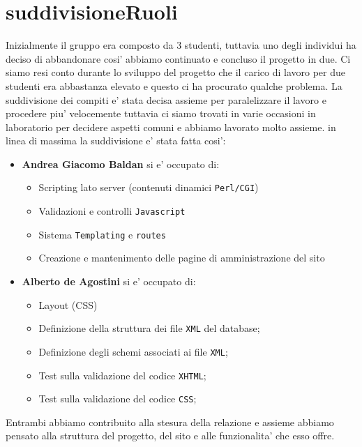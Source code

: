 \section{suddivisioneRuoli}

Inizialmente il gruppo era composto da 3 studenti, tuttavia uno degli individui ha deciso di abbandonare cosi' abbiamo continuato e concluso il progetto in due.
Ci siamo resi conto durante lo sviluppo del progetto che il carico di lavoro per due studenti era abbastanza elevato e questo ci ha procurato qualche problema.
La suddivisione dei compiti e' stata decisa assieme per paralelizzare il lavoro e procedere piu' velocemente tuttavia ci siamo trovati in varie occasioni in laboratorio per decidere aspetti comuni e abbiamo lavorato molto assieme.
in linea di massima la suddivisione e' stata fatta cosi':
\begin{itemize}
	\item \textbf{Andrea Giacomo Baldan} si e' occupato di:
	\begin{itemize}
		\item Scripting lato server (contenuti dinamici \texttt{Perl/CGI})
		\item Validazioni e controlli \texttt{Javascript} 
		\item Sistema \texttt{Templating} e \texttt{routes}
		\item Creazione e mantenimento delle pagine di amministrazione del sito
	\end{itemize}
	\item \textbf{Alberto de Agostini} si e' occupato di:
	\begin{itemize}
		\item Layout (CSS)
		\item Definizione della struttura dei file \texttt{XML} del database;
		\item Definizione degli schemi associati ai file \texttt{XML};
		\item Test sulla validazione del codice \texttt{XHTML};
		\item Test sulla validazione del codice \texttt{CSS};
	\end{itemize}
\end{itemize}
Entrambi abbiamo contribuito alla stesura della relazione e assieme abbiamo pensato alla struttura del progetto, del sito e alle funzionalita' che esso offre.
